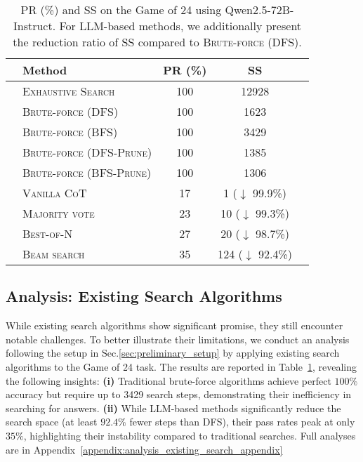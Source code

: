 \begin{table}[t]
\caption{PR (\%) and SS on the Game of 24 using Qwen2.5-72B-Instruct. For LLM-based methods, we additionally present the reduction ratio of SS compared to \textsc{Brute-force (DFS)}.
}
\vspace*{-0.5em}
\centering
\small
\tabcolsep 3.5pt
\renewcommand\arraystretch{1.0}
\begin{tabular}{llccc}
\toprule
\multirow{2}{*}{} &
\multirow{1}{*}{Method} &
\multicolumn{1}{c}{PR (\%)} &
\multicolumn{1}{c}{SS} \\
\midrule
&\textsc{Exhaustive Search}&\num{100} &\num{12928}\\
\addlinespace[0.1em]\hdashline\addlinespace[0.1em]
&\textsc{Brute-force (DFS)}&\num{100} &\num{1623} \\
&\textsc{Brute-force (BFS)}&\num{100} &\num{3429} \\
&\textsc{Brute-force (DFS-Prune)}&\num{100} &\num{1385}\\
&\textsc{Brute-force (BFS-Prune)}&\num{100} &\num{1306}\\
\midrule
&\textsc{Vanilla CoT} &\num{17}   &\num{1} ({$\downarrow$} 99.9\%) \\
&\textsc{Majority vote} &\num{23}  &\num{10} ({$\downarrow$} 99.3\%) \\
&\textsc{Best-of-N}&\num{27}  &\num{20} ({$\downarrow$} 98.7\%)\\
&\textsc{Beam search}
&\num{35} &\num{124} ({$\downarrow$} 92.4\%)\\
\bottomrule
\end{tabular}
\vspace{-1em}
\label{tab:preliminary_24game_qwen}
\end{table}
\subsection{Analysis: Existing Search Algorithms}
\label{sec:analysis_existing_search}
While existing search algorithms show significant promise, they still encounter notable challenges. 
To better illustrate their limitations, we conduct an analysis following the setup in Sec.\ref{sec:preliminary_setup} by applying existing search algorithms to the Game of 24 task.
The results are reported in Table~\ref{tab:preliminary_24game_qwen}, revealing the following insights: \textbf{(i)} Traditional brute-force algorithms achieve perfect $100\%$ accuracy but require up to \num{3429} search steps, demonstrating their inefficiency in searching for answers.
\textbf{(ii)} While LLM-based methods significantly reduce the search space (at least $92.4\%$ fewer steps than \textsc{DFS}), their pass rates peak at only $35\%$, highlighting their instability compared to traditional searches. Full analyses are in Appendix~\ref{appendix:analysis_existing_search_appendix}

